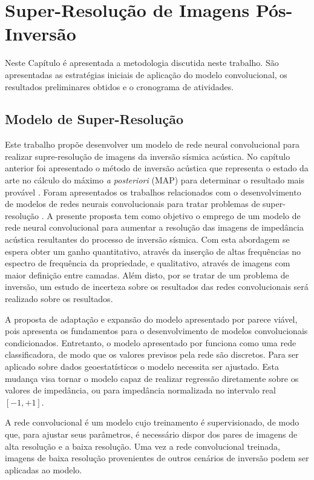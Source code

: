 \chapter{Super-Resolução de Imagens Pós-Inversão}
\label{cap:3modeloHibrido}

Neste Capítulo é apresentada a metodologia discutida neste trabalho.
São apresentadas as estratégias iniciais de aplicação do modelo convolucional,
os resultados preliminares obtidos e o cronograma de atividades.

\section{Modelo de Super-Resolução}

Este trabalho propõe desenvolver um modelo de rede neural convolucional para
realizar supre-resolução de imagens da inversão sísmica acústica.
No capítulo anterior foi apresentado o método de inversão acústica que
representa o estado da arte no cálculo do máximo \textit{a posteriori} (MAP) para determinar o
resultado mais provável \citep{Buland01012003, Figueiredo2014}. Foram apresentados os trabalhos relacionados
com o desenvolvimento de modelos de redes neurais convolucionais para tratar problemas de
super-resolução \citep{Oord16,He2016,DahlNS17}. 
% 
A presente proposta tem como objetivo o emprego de um modelo de rede neural convolucional
para aumentar a resolução das imagens de impedância acústica
resultantes do processo de inversão sísmica. Com esta abordagem se espera obter um ganho
quantitativo, através da inserção de altas frequências no espectro de frequência da
propriedade, e qualitativo, através de imagens com maior definição entre camadas.
Além disto, por se tratar de um problema de inversão, um estudo de incerteza sobre os
resultados das redes convolucionais será realizado sobre os resultados.

A proposta de adaptação e expansão do modelo apresentado por
\cite{DahlNS17} parece viável, pois apresenta os fundamentos para o desenvolvimento
de modelos convolucionais condicionados. Entretanto, o modelo apresentado por
\cite{} funciona como uma rede classificadora, de modo que os valores previsos
pela rede são discretos. Para ser aplicado sobre dados geoestatísticos o modelo
necessita ser ajustado. Esta mudança visa tornar o modelo capaz de realizar regressão
diretamente sobre os valores de impedância, ou para impedância normalizada no intervalo real
$[-1,+1]$.

A rede convolucional é um modelo cujo treinamento é supervisionado, de modo que,
para ajustar seus parâmetros, é necessário dispor dos pares de imagens de alta
resolução e a baixa resolução. Uma vez a rede convolucional treinada,
imagens de baixa resolução provenientes de outros cenários de inversão podem ser aplicadas ao modelo.

